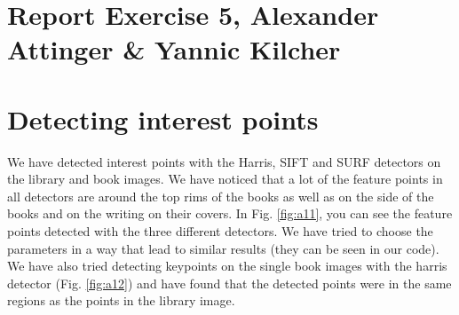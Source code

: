 \documentclass[11pt,a4paper]{article}
\begin{document}
\section*{Report Exercise 5, Alexander Attinger \& Yannic Kilcher}

\section{Detecting interest points}
We have detected interest points with the Harris, SIFT and SURF detectors on the library and book images. We have noticed that a lot of the feature points in all detectors are around the top rims of the books as well as on the side of the books and on the writing on their covers. In Fig. \ref{fig:a11}, you can see the feature points detected with the three different detectors. We have tried to choose the parameters in a way that lead to similar results (they can be seen in our code).
We have also tried detecting keypoints on the single book images with the harris detector (Fig. \ref{fig:a12}) and have found that the detected points were in the same regions as the points in the library image.
\end{document}
